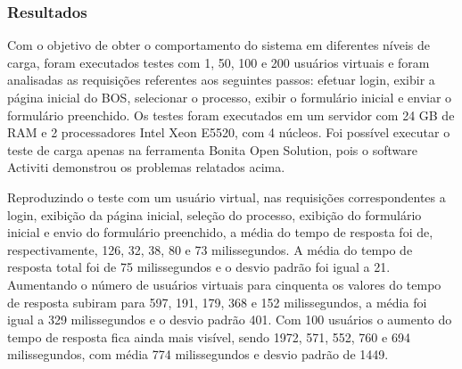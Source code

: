 \documentclass[12pt]{article}
\begin{document}



\subsubsection{Resultados}
Com o objetivo de obter o comportamento do sistema em diferentes níveis de carga, foram executados testes com 1, 50, 100 e 200 usuários virtuais e foram analisadas as requisições referentes aos seguintes passos: efetuar login, exibir a página inicial do BOS, selecionar o processo, exibir o formulário inicial e enviar o formulário preenchido. Os testes foram executados em um servidor com 24 GB de RAM e 2 processadores Intel Xeon E5520, com 4 núcleos. Foi possível executar o teste de carga apenas na ferramenta Bonita Open Solution, pois o software Activiti demonstrou os problemas relatados acima.

Reproduzindo o teste com um usuário virtual, nas requisições correspondentes a login, exibição da página inicial, seleção do processo, exibição do formulário inicial e envio do formulário preenchido, a média do tempo de resposta foi de, respectivamente, 126, 32, 38, 80 e 73 milissegundos. A média do tempo de resposta total foi de 75 milissegundos e o desvio padrão foi igual a 21.  Aumentando o número de usuários virtuais para cinquenta os valores do tempo de resposta subiram para 597, 191, 179, 368 e 152 milissegundos, a média foi igual a 329 milissegundos e o desvio padrão 401. Com 100 usuários o aumento do tempo de resposta fica ainda mais visível, sendo 1972, 571, 552, 760 e 694 milissegundos, com média 774 milissegundos e desvio padrão de 1449.
\end{document}
